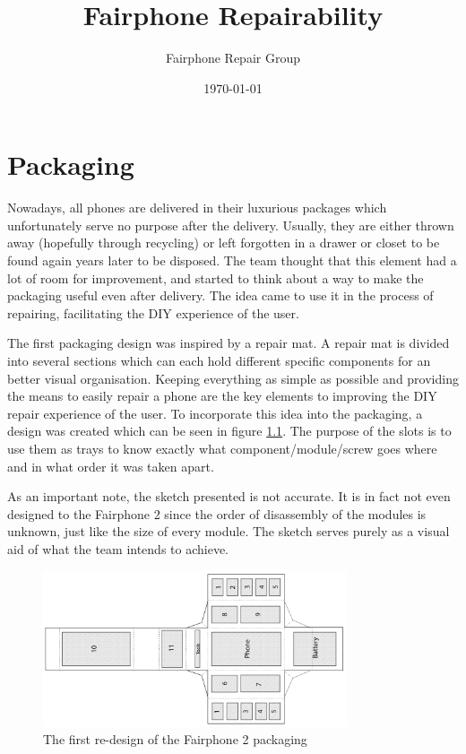 \documentclass[final,a4paper]{report} %
\author{Fairphone Repair Group}
\title{Fairphone Repairability}
\date{\today}
\begin{document}
	\chapter{Packaging}
	\label{ch:packaging}
	Nowadays, all phones are delivered in their luxurious packages which unfortunately serve no purpose after the delivery. Usually, they are either thrown away (hopefully through recycling) or left forgotten in a drawer or closet to be found again years later to be disposed. The team thought that this element had a lot of room for improvement, and started to think about a way to make the packaging useful even after delivery. The idea came to use it in the process of repairing, facilitating the DIY experience of the user. 
	
	The first packaging design was inspired by a repair mat. A repair mat is divided into several sections which can each hold different specific components for an better visual organisation. Keeping everything as simple as possible and providing the means to easily repair a phone are the key elements to improving the DIY repair experience of the user. To incorporate this idea into the packaging, a design was created which can be seen in figure \ref{fig:Box design 1}. The purpose of the slots is to use them as trays to know exactly what component/module/screw goes where and in what order it was taken apart. 
	
	As an important note, the sketch presented is not accurate. It is in fact not even designed to the Fairphone 2 since the order of disassembly of the modules is unknown, just like the size of every module. The sketch serves purely as a visual aid of what the team intends to achieve.
	
	\begin{figure}[H]
		\centering
		\includegraphics[width=0.8\textwidth]{resources/BoxDesign1}
		\caption{The first re-design of the Fairphone 2 packaging}
		\label{fig:Box design 1}
	\end{figure}
	
\end{document}
